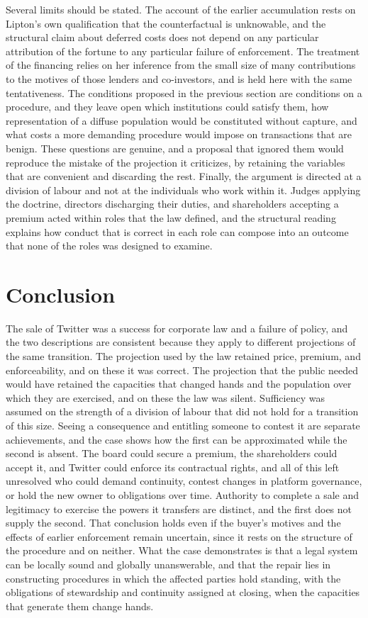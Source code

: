 \documentclass[11pt]{article}
\theoremstyle{definition}
\begin{document}
Several limits should be stated. The account of the earlier accumulation rests on Lipton's own qualification that the counterfactual is unknowable, and the structural claim about deferred costs does not depend on any particular attribution of the fortune to any particular failure of enforcement. The treatment of the financing relies on her inference from the small size of many contributions to the motives of those lenders and co-investors, and is held here with the same tentativeness. The conditions proposed in the previous section are conditions on a procedure, and they leave open which institutions could satisfy them, how representation of a diffuse population would be constituted without capture, and what costs a more demanding procedure would impose on transactions that are benign. These questions are genuine, and a proposal that ignored them would reproduce the mistake of the projection it criticizes, by retaining the variables that are convenient and discarding the rest. Finally, the argument is directed at a division of labour and not at the individuals who work within it. Judges applying the doctrine, directors discharging their duties, and shareholders accepting a premium acted within roles that the law defined, and the structural reading explains how conduct that is correct in each role can compose into an outcome that none of the roles was designed to examine.

\section{Conclusion}

The sale of Twitter was a success for corporate law and a failure of policy, and the two descriptions are consistent because they apply to different projections of the same transition. The projection used by the law retained price, premium, and enforceability, and on these it was correct. The projection that the public needed would have retained the capacities that changed hands and the population over which they are exercised, and on these the law was silent. Sufficiency was assumed on the strength of a division of labour that did not hold for a transition of this size. Seeing a consequence and entitling someone to contest it are separate achievements, and the case shows how the first can be approximated while the second is absent. The board could secure a premium, the shareholders could accept it, and Twitter could enforce its contractual rights, and all of this left unresolved who could demand continuity, contest changes in platform governance, or hold the new owner to obligations over time. Authority to complete a sale and legitimacy to exercise the powers it transfers are distinct, and the first does not supply the second. That conclusion holds even if the buyer's motives and the effects of earlier enforcement remain uncertain, since it rests on the structure of the procedure and on neither. What the case demonstrates is that a legal system can be locally sound and globally unanswerable, and that the repair lies in constructing procedures in which the affected parties hold standing, with the obligations of stewardship and continuity assigned at closing, when the capacities that generate them change hands.
\end{document}
